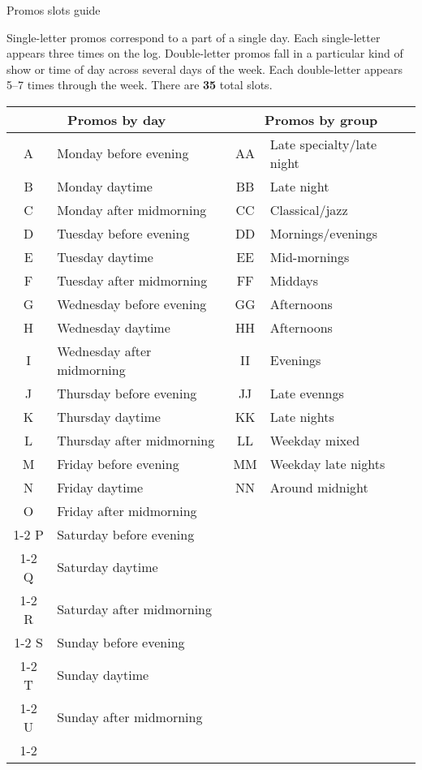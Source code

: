 \documentclass{article}
\begin{document}
\begin{center}
\Large Promos slots guide
\end{center}

Single-letter promos correspond to a part of a single day.  Each
single-letter appears three times on the log.  Double-letter promos
fall in a particular kind of show or time of day across several days
of the week.  Each double-letter appears 5--7 times through the week.
There are \textbf{35} total slots.

\begin{center}
\def\bothl#1#2#3{#1 & #2 & #1#1 & #3 \\ \hline}
\def\dayl#1#2{#1 & #2 \\ \cline{1-2}}
\begin{tabular}{|c|l||c|l|}
\hline \multicolumn{2}{|c||}{Promos by day} & \multicolumn{2}{c|}{Promos by group} \\ \hline\hline
\bothl A{Monday before evening}{Late specialty/late night}
\bothl B{Monday daytime}{Late night}
\bothl C{Monday after midmorning}{Classical/jazz}
\bothl D{Tuesday before evening}{Mornings/evenings}
\bothl E{Tuesday daytime}{Mid-mornings}
\bothl F{Tuesday after midmorning}{Middays}
\bothl G{Wednesday before evening}{Afternoons}
\bothl H{Wednesday daytime}{Afternoons}
\bothl I{Wednesday after midmorning}{Evenings}
\bothl J{Thursday before evening}{Late evenngs}
\bothl K{Thursday daytime}{Late nights}
\bothl L{Thursday after midmorning}{Weekday mixed}
\bothl M{Friday before evening}{Weekday late nights}
\bothl N{Friday daytime}{Around midnight}
\dayl  O{Friday after midmorning}
\dayl  P{Saturday before evening}
\dayl  Q{Saturday daytime}
\dayl  R{Saturday after midmorning}
\dayl  S{Sunday before evening}
\dayl  T{Sunday daytime}
\dayl  U{Sunday after midmorning}
\end{tabular}
\end{center}
\end{document}
